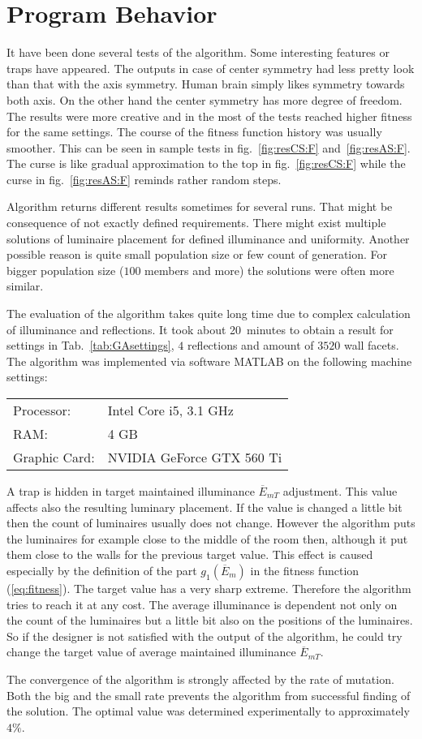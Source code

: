 \section{Program Behavior}
It have been done several tests of the algorithm. Some interesting features or traps have appeared. The outputs in case of center symmetry had less pretty look than that with the axis symmetry. Human brain simply likes symmetry towards both axis. On the other hand the center symmetry has more degree of freedom. The results were more creative and in the most of the tests reached higher fitness for the same settings. The course of the fitness function history was usually smoother. This can be seen in sample tests in fig.~\ref{fig:resCS:F} and~\ref{fig:resAS:F}. The curse is like gradual approximation to the top in fig.~\ref{fig:resCS:F} while the curse in fig.~\ref{fig:resAS:F} reminds rather random steps.

Algorithm returns different results sometimes for several runs. That might be consequence of not exactly defined requirements. There might exist multiple solutions of luminaire placement for defined illuminance and uniformity. Another possible reason is quite small population size or few count of generation. For bigger population size ($100$ members and more) the solutions were often more similar.

The evaluation of the algorithm takes quite long time due to complex calculation of illuminance and reflections. It took about 20~minutes to obtain a result for settings in Tab.~\ref{tab:GAsettings}, $4$ reflections and amount of $3520$ wall facets. The algorithm was implemented via software MATLAB on the following machine settings:

\begin{table}[htb]
	\renewcommand{\arraystretch}{1.3}
	\centering
  \begin{tabular}{ l l }
    Processor: & Intel Core i5, 3.1 GHz \\
    RAM: & 4 GB \\
		Graphic Card: & NVIDIA GeForce GTX 560 Ti \\
  \end{tabular}
\end{table}

A trap is hidden in target maintained illuminance $\overline{E}_{mT}$ adjustment. This value affects also the resulting luminary placement. If the value is changed a little bit then the count of luminaires usually does not change. However the algorithm puts the luminaires for example close to the middle of the room then, although it put them close to the walls for the previous target value. This effect is caused especially by the definition of the part $g_1\left(\overline{E}_{m}\right)$ in the fitness function (\ref{eq:fitness}). The target value has a very sharp extreme. Therefore the algorithm tries to reach it at any cost. The average illuminance is dependent not only on the count of the luminaires but a little bit also on the positions of the luminaires. So if the designer is not satisfied with the output of the algorithm, he could try change the target value of average maintained illuminance $\overline{E}_{mT}$.

The convergence of the algorithm is strongly affected by the rate of mutation. Both the big and the small rate prevents the algorithm from successful finding of the solution. The optimal value was determined experimentally to approximately $4 \%$.